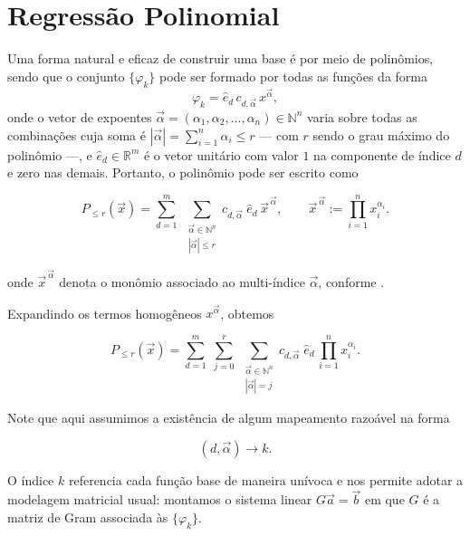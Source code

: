 \section{Regressão Polinomial}
\label{sec:regressao}

Uma forma natural e eficaz de construir uma base é por meio de polinômios,
sendo que o conjunto \(\{\varphi_k\}\) pode ser formado por todas as funções
da forma
\begin{equation*}
    \varphi_k = \hat{e}_d \, c_{d,\vec{\alpha}} \, x^{\vec{\alpha}},
\end{equation*}
onde o vetor de expoentes $\vec{\alpha} = (\alpha_1, \alpha_2, \ldots, \alpha_n)
\in \mathbb{N}^n$ varia sobre todas as combinações cuja soma é
$|\vec{\alpha}| = \sum_{i=1}^n \alpha_i \le r$ --- com $r$ sendo o grau máximo
do polinômio ---, e $\hat{e}_d \in \mathbb{R}^m$ é o vetor unitário com valor
$1$ na componente de índice $d$ e zero nas demais.
Portanto, o polinômio pode ser escrito como

\begin{equation*}
    P_{\le r}(\vec{x}) =
        \sum_{d=1}^{m}\;
        \sum_{\substack{\vec{\alpha}\in\mathbb{N}^n\\|\vec{\alpha}|\le r}}
        c_{d,\vec{\alpha}}\;\hat{e}_d\,\vec{x}^{\,\vec{\alpha}},
        \qquad
        \vec{x}^{\,\vec{\alpha}}:=
        \prod_{i=1}^{n} x_i^{\alpha_i}.
\end{equation*}

onde \(\vec{x}^{\,\vec{\alpha}}\) denota o monômio associado ao multi-índice
\(\vec{\alpha}\), conforme \cite{burden_faires_2011}.

Expandindo os termos homogêneos $x^{\vec\alpha}$, obtemos

\begin{equation*}
    P_{\le r}(\vec{x}) =
    \sum_{d=1}^{m} \;
    \sum_{j=0}^{r} \;
    \sum_{\substack{\vec{\alpha}\in\mathbb{N}^n\\|\vec{\alpha}|=j}}
    c_{d,\vec{\alpha}}\;\hat{e}_d\,
    \prod_{i=1}^{n} x_i^{\alpha_i}.
\end{equation*}

Note que aqui assumimos a existência de algum mapeamento razoável na forma

\begin{equation*}
    (d,\vec\alpha) \to k.
\end{equation*}

O índice $k$ referencia cada função base de maneira unívoca e nos permite adotar
a modelagem matricial usual: montamos o sistema linear $G\vec{a} = \vec{b}$ em
que $G$ é a matriz de Gram associada às $\{\varphi_k\}$.

